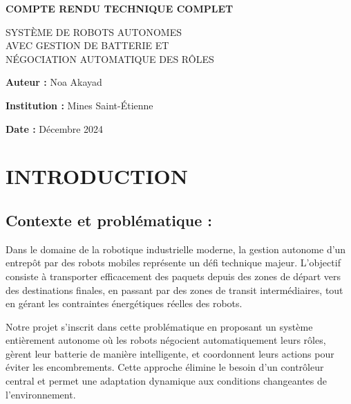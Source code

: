 \documentclass[12pt,a4paper]{article}
\begin{document}
\begin{titlepage}
    \centering
    \vspace*{2cm}

    {\Huge\bfseries COMPTE RENDU TECHNIQUE COMPLET}

    \vspace{1cm}

    {\LARGE\color{blue!80!black} SYSTÈME DE ROBOTS AUTONOMES\\AVEC GESTION DE BATTERIE ET\\NÉGOCIATION AUTOMATIQUE DES RÔLES}

    \vspace{2cm}

    \vspace{2cm}

    {\Large\bfseries Auteur :} {\Large Noa Akayad}

    \vspace{0.5cm}

    {\Large\bfseries Institution :} {\Large Mines Saint-Étienne}

    \vspace{0.5cm}

    {\Large\bfseries Date :} {\Large Décembre 2024}

    \vfill

\end{titlepage}

\tableofcontents
\newpage

\section{INTRODUCTION}
\subsection{Contexte et problématique :}

Dans le domaine de la robotique industrielle moderne, la gestion autonome d'un entrepôt par des robots mobiles représente un défi technique majeur. L'objectif consiste à transporter efficacement des paquets depuis des zones de départ vers des destinations finales, en passant par des zones de transit intermédiaires, tout en gérant les contraintes énergétiques réelles des robots.

Notre projet s'inscrit dans cette problématique en proposant un système entièrement autonome où les robots négocient automatiquement leurs rôles, gèrent leur batterie de manière intelligente, et coordonnent leurs actions pour éviter les encombrements. Cette approche élimine le besoin d'un contrôleur central et permet une adaptation dynamique aux conditions changeantes de l'environnement.
\end{document}
